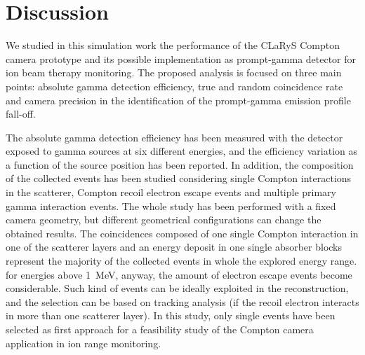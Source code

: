 \section{Discussion}

We studied in this simulation work the performance of the CLaRyS Compton camera prototype and its possible implementation as prompt-gamma detector for ion beam therapy monitoring. The proposed analysis is focused on three main points: absolute gamma detection efficiency, true and random coincidence rate and camera precision in the identification of the prompt-gamma emission profile fall-off.

The absolute gamma detection efficiency has been measured with the detector exposed to gamma sources at six different energies, and the efficiency variation as a function of the source position has been reported. In addition, the composition of the collected events has been studied considering single Compton interactions in the scatterer, Compton recoil electron escape events and multiple primary gamma interaction events. The whole study has been performed with a fixed camera geometry, but different geometrical configurations can change the obtained results. The coincidences composed of one single Compton interaction in one of the scatterer layers and an energy deposit in one single absorber blocks represent the majority of the collected events in whole the explored energy range. for energies above 1~MeV, anyway, the amount of electron escape events become considerable. Such kind of events can be ideally exploited in the reconstruction, and the selection can be based on tracking analysis (if the recoil electron interacts in more than one scatterer layer). In this study, only single events have been selected as first approach for a feasibility study of the Compton camera application in ion range monitoring. 
